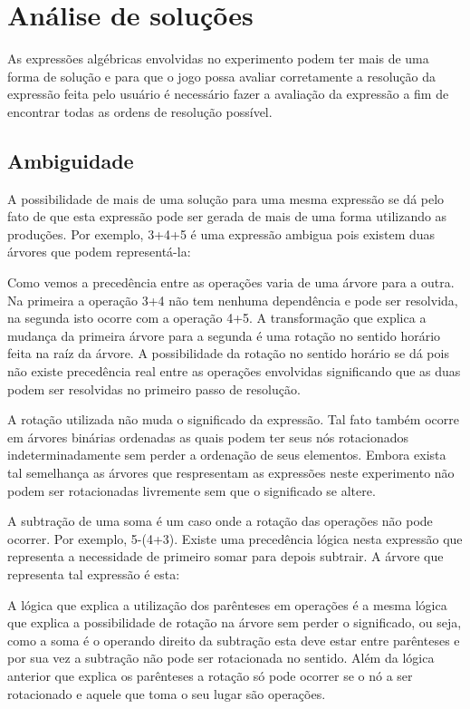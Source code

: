 \chapter{Análise de soluções}
As expressões algébricas envolvidas no experimento podem ter mais de uma forma de solução e para que o jogo possa avaliar corretamente a resolução da expressão feita pelo usuário é necessário fazer a avaliação da expressão a fim de encontrar todas as ordens de resolução possível.

\section{Ambiguidade}
A possibilidade de mais de uma solução para uma mesma expressão se dá pelo fato de que esta expressão pode ser gerada de mais de uma forma utilizando as produções. Por exemplo, 3+4+5 é uma expressão ambigua pois existem duas árvores que podem representá-la:
     
Como vemos a precedência entre as operações varia de uma árvore para a outra. Na primeira a operação 3+4 não tem nenhuma dependência e pode ser resolvida, na segunda isto ocorre com a operação 4+5. A transformação que explica a mudança da primeira árvore para a segunda é uma rotação no sentido horário feita na raíz da árvore. A possibilidade da rotação no sentido horário se dá pois não existe precedência real entre as operações envolvidas significando que as duas podem ser resolvidas no primeiro passo de resolução.

	A rotação utilizada não muda o significado da expressão. Tal fato também ocorre em árvores binárias ordenadas as quais podem ter seus nós rotacionados indeterminadamente sem perder a ordenação de seus elementos. Embora exista tal semelhança as árvores que respresentam as expressões neste experimento não podem ser rotacionadas livremente sem que o significado se altere.
	
	A subtração de uma soma é um caso onde a rotação das operações não pode ocorrer. Por exemplo, 5-(4+3). Existe uma precedência lógica nesta expressão que representa a necessidade de primeiro somar para depois subtrair. A árvore que representa tal expressão é esta:
           
A lógica que explica a utilização dos parênteses em operações é a mesma lógica que explica  a possibilidade de rotação na árvore sem perder o significado, ou seja, como a soma é o operando direito da subtração esta deve estar entre parênteses e por sua vez a subtração não pode ser rotacionada no sentido. Além da lógica anterior que explica os parênteses a rotação só pode ocorrer se o nó a ser rotacionado e aquele que toma o seu lugar são operações.

